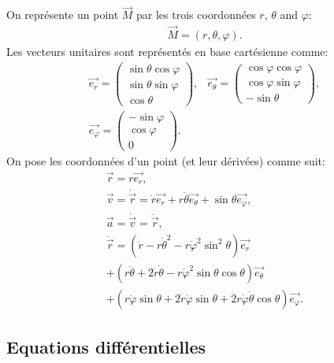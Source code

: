 \begin{multicols}{2}
    On représente un point $\vec{M}$ par les trois coordonnées $r$, $\theta$ and $\varphi$:
    \begin{align*}
        \vec{M} = (r, \theta, \varphi).
    \end{align*}
    Les vecteurs unitaires sont représentés en base cartésienne comme:
    \begin{align*}
        \vec{e_r} = \begin{pmatrix} 
            \sin \theta \cos \varphi  \\
            \sin \theta \sin \varphi \\
            \cos \theta
        \end{pmatrix}, & 
        \vec{e_\theta} = \begin{pmatrix} 
            \cos \varphi \cos \varphi \\
            \cos \varphi \sin \varphi \\
            - \sin \theta
        \end{pmatrix}, \\
        \vec{e_\varphi} = \begin{pmatrix} 
            -\sin \varphi \\
            \cos \varphi \\
            0
        \end{pmatrix}.
    \end{align*}
    On pose les coordonnées d'un point (et leur dérivées) comme suit:
    \begin{align*}
        \vec{r} = r \vec{e_r}, \\
        \vec{v} = \dot{\vec{r}} = \dot{r} \vec{e_r} + r \dot{\theta} \vec{e_\theta} + \sin \theta \vec{e_\varphi}, \\
        \vec{a} = \dot{\vec{v}} = \ddot{\vec{r}}, \\
        \ddot{\vec{r}} = (\ddot{r} - r \dot{\theta}^2 - r \dot{\varphi}^2 \sin^2 \theta) \vec{e_r}  \\
        + (r \ddot{\theta} + 2 \dot{r} \dot{\theta} - r \dot{\varphi}^2 \sin \theta \cos \theta) \vec{e_\theta} \\
        + (r \ddot{\varphi} \sin \theta + 2 \dot{r} \dot{\varphi}\sin\theta + 2 r \dot{\varphi} \dot{\theta} \cos \theta) \vec{e_\varphi}.
    \end{align*}
    
    \subsection{Equations différentielles}
    

\end{multicols}
